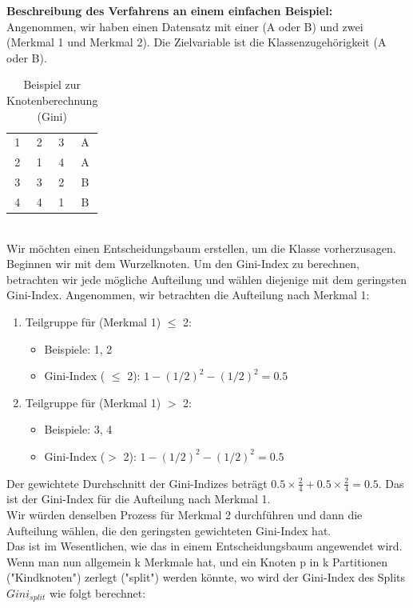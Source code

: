 \documentclass[12pt]{article}
\begin{document}
\textbf{Beschreibung des Verfahrens an einem einfachen Beispiel:}\\
%
Angenommen, wir haben einen Datensatz mit einer {\color{red}{Klassenzughörigkeit}} (A oder B) und zwei {\color{blue}{Merkmalen}} (Merkmal 1 und Merkmal 2). Die Zielvariable ist die Klassenzugehörigkeit (A oder B). 
%
\begin{table}[h]
\centering
  \caption{Beispiel zur Knotenberechnung (Gini)}
  \label{tab:Beispiel-Tabelle}
\begin{tabular}{|c|c|c|c|}
\hline
\color{black}{Beispiel} & \color{blue}{Merkmal 1} & \color{blue}{Merkmal 2} & \color{red}{Klasse} \\
\hline
1 & 2 & 3 & A \\
2 & 1 & 4 & A \\
3 & 3 & 2 & B \\
4 & 4 & 1 & B \\
\hline
\end{tabular}
\end{table}\\[0.3cm]
%
Wir möchten einen Entscheidungsbaum erstellen, um die Klasse vorherzusagen. Beginnen wir mit dem Wurzelknoten. Um den Gini-Index zu berechnen, betrachten wir jede mögliche Aufteilung und wählen diejenige mit dem geringsten Gini-Index.
%
Angenommen, wir betrachten die Aufteilung nach Merkmal 1:
%
\begin{enumerate}
    \item Teilgruppe für (Merkmal 1) $\leq$ 2:
        \begin{itemize}
            \item Beispiele: 1, 2
            \item Gini-Index ( $\leq$ 2): $1 - (1/2)^2 - (1/2)^2 = 0.5$
        \end{itemize}
    \item Teilgruppe für (Merkmal 1) $ > $ 2:
        \begin{itemize}
            \item Beispiele: 3, 4
            \item Gini-Index ($>$ 2): $1 - (1/2)^2 - (1/2)^2 = 0.5$
        \end{itemize}
\end{enumerate}
%
Der gewichtete Durchschnitt der Gini-Indizes beträgt $0.5 \times \frac{2}{4} + 0.5 \times \frac{2}{4} = 0.5$. Das ist der Gini-Index für die Aufteilung nach Merkmal 1.\\[0.2cm]
Wir würden denselben Prozess für Merkmal 2 durchführen und dann die Aufteilung wählen, die den geringsten gewichteten Gini-Index hat.\\
Das ist im Wesentlichen, wie das {\color{blue}{Gini-Index Verfahren}} in einem Entscheidungsbaum angewendet wird.\\[0.4cm]
Wenn man nun allgemein k Merkmale hat, und ein Knoten p in k Partitionen ("Kindknoten") zerlegt ("split") werden könnte, wo wird der Gini-Index des Splits $Gini_{split}$ wie folgt berechnet:
\end{document}
